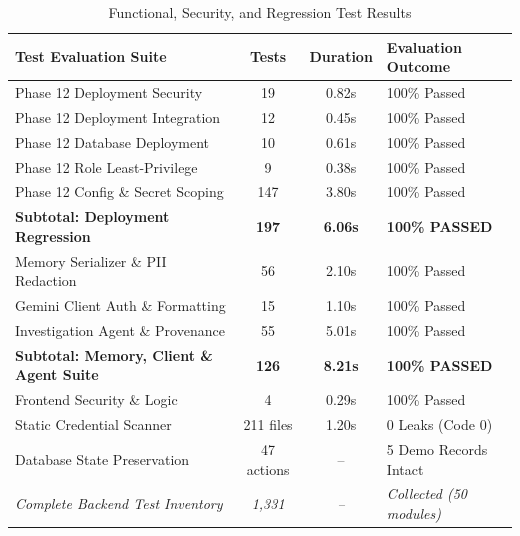 \documentclass[conference]{IEEEtran}
\begin{document}
\begin{table}[t]
\caption{Functional, Security, and Regression Test Results}
\label{tab:test_results}
\centering
\begin{tabular}{lccl}
\toprule
\textbf{Test Evaluation Suite} & \textbf{Tests} & \textbf{Duration} & \textbf{Evaluation Outcome} \\
\midrule
Phase 12 Deployment Security & 19 & 0.82s & 100\% Passed \\
Phase 12 Deployment Integration & 12 & 0.45s & 100\% Passed \\
Phase 12 Database Deployment & 10 & 0.61s & 100\% Passed \\
Phase 12 Role Least-Privilege & 9 & 0.38s & 100\% Passed \\
Phase 12 Config \& Secret Scoping & 147 & 3.80s & 100\% Passed \\
\midrule
\textbf{Subtotal: Deployment Regression} & \textbf{197} & \textbf{6.06s} & \textbf{100\% PASSED} \\
\midrule
Memory Serializer \& PII Redaction & 56 & 2.10s & 100\% Passed \\
Gemini Client Auth \& Formatting & 15 & 1.10s & 100\% Passed \\
Investigation Agent \& Provenance & 55 & 5.01s & 100\% Passed \\
\midrule
\textbf{Subtotal: Memory, Client \& Agent Suite} & \textbf{126} & \textbf{8.21s} & \textbf{100\% PASSED} \\
\midrule
Frontend Security \& Logic & 4 & 0.29s & 100\% Passed \\
Static Credential Scanner & 211 files & 1.20s & 0 Leaks (Code 0) \\
Database State Preservation & 47 actions & -- & 5 Demo Records Intact \\
\midrule
\textit{Complete Backend Test Inventory} & \textit{1,331} & \textit{--} & \textit{Collected (50 modules)} \\
\bottomrule
\end{tabular}
\end{table}
\end{document}
